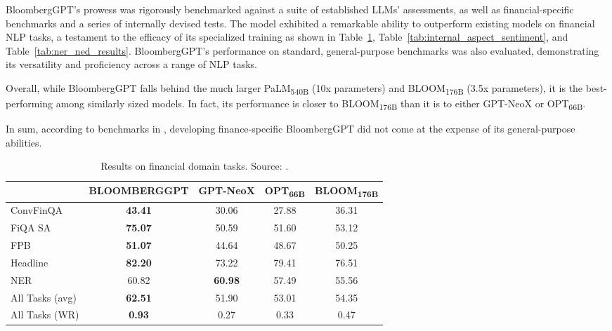 BloombergGPT's prowess was rigorously benchmarked against a suite of established LLMs' assessments, as well as financial-specific benchmarks and a series of internally devised tests.
The model exhibited a remarkable ability to outperform existing models on financial NLP tasks, a testament to the efficacy of its specialized training as shown in Table~\ref{tab:financial_tasks}, Table~\ref{tab:internal_aspect_sentiment}, and Table~\ref{tab:ner_ned_results}.
BloombergGPT's performance on standard, general-purpose benchmarks was also evaluated, demonstrating its versatility and proficiency across a range of NLP tasks.

Overall, while BloombergGPT falls behind the much larger PaLM\textsubscript{540B} (10x parameters) and BLOOM\textsubscript{176B} (3.5x parameters), it is the best-performing among similarly sized models.
In fact, its performance is closer to BLOOM\textsubscript{176B} than it is to either GPT-NeoX or OPT\textsubscript{66B}.

In sum, according to benchmarks in \textcite{wu2023bloomberggpt}, developing finance-specific BloombergGPT did not come at the expense of its general-purpose abilities.


\begin{table}[h]
	\begin{tabularx}{\textwidth}{Xcccc}
		\toprule
		                & \textbf{BLOOMBERGGPT} & \textbf{GPT-NeoX} & \textbf{OPT\textsubscript{66B}} & \textbf{BLOOM\textsubscript{176B}} \\
		\midrule
		ConvFinQA       & \textbf{43.41}        & 30.06             & 27.88                           & 36.31                              \\
		FiQA SA         & \textbf{75.07}        & 50.59             & 51.60                           & 53.12                              \\
		FPB             & \textbf{51.07}        & 44.64             & 48.67                           & 50.25                              \\
		Headline        & \textbf{82.20}        & 73.22             & 79.41                           & 76.51                              \\
		NER             & 60.82                 & \textbf{60.98}    & 57.49                           & 55.56                              \\
		\midrule
		All Tasks (avg) & \textbf{62.51}        & 51.90             & 53.01                           & 54.35                              \\
		All Tasks (WR)  & \textbf{0.93}         & 0.27              & 0.33                            & 0.47                               \\
		\bottomrule
	\end{tabularx}
	\caption{Results on financial domain tasks. Source: \protect\textcite{wu2023bloomberggpt}.}
	\label{tab:financial_tasks}
\end{table}

